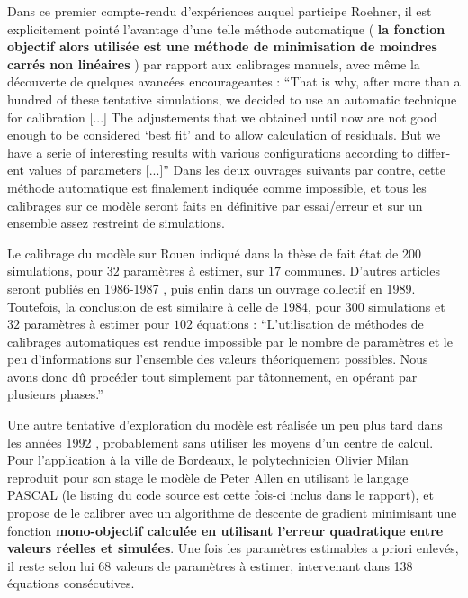 Dans ce premier compte-rendu d'expériences auquel participe Roehner, il est explicitement pointé l’avantage d’une telle méthode automatique ( \textbf{la fonction objectif alors utilisée est une méthode de minimisation de moindres carrés non linéaires }) par rapport aux calibrages manuels, avec même la découverte de quelques avancées encourageantes : \foreignquote{english}{That is why, after more than a hundred of these tentative simulations, we decided to use an automatic technique for calibration [...] The adjustements that we obtained until now are not good enough to be considered \enquote{best fit} and to allow calculation of residuals. But we have a serie of interesting results with various configurations according to different values of parameters [...]} Dans les deux ouvrages suivants par contre, cette méthode automatique est finalement indiquée comme impossible, et tous les calibrages sur ce modèle seront faits en définitive par essai/erreur et sur un ensemble assez restreint de simulations.

Le calibrage du modèle sur Rouen indiqué dans la thèse de \autocites[348,354]{Sanders1984}{Sanders1985} fait état de $200$ simulations, pour $32$ paramètres à estimer, sur $17$ communes. D'autres articles seront publiés en 1986-1987 \autocites{Pumain1986, Pumain1987}, puis enfin dans un ouvrage collectif en 1989. Toutefois, la conclusion de \textcite[112]{Pumain1989} est similaire à celle de 1984, pour $300$ simulations et $32$ paramètres à estimer pour $102$ équations : \enquote{L’utilisation de méthodes de calibrages automatiques est rendue impossible par le nombre de paramètres et le peu d’informations sur l’ensemble des valeurs théoriquement possibles. Nous avons donc dû procéder tout simplement par tâtonnement, en opérant par plusieurs phases.}

Une autre tentative d'exploration du modèle est réalisée un peu plus tard dans les années 1992 \autocite{Milan1992}, probablement sans utiliser les moyens d'un centre de calcul. Pour l'application à la ville de Bordeaux, le polytechnicien Olivier Milan reproduit \autocite{Wilensky2007a} pour son stage le modèle de Peter Allen en utilisant le langage PASCAL (le listing du code source est cette fois-ci inclus dans le rapport), et propose de le calibrer avec un algorithme de descente de gradient minimisant une fonction \textbf{mono-objectif calculée en utilisant l'erreur quadratique entre valeurs réelles et simulées}. Une fois les paramètres estimables a priori enlevés, il reste selon lui 68 valeurs de paramètres à estimer, intervenant dans 138 équations consécutives.

